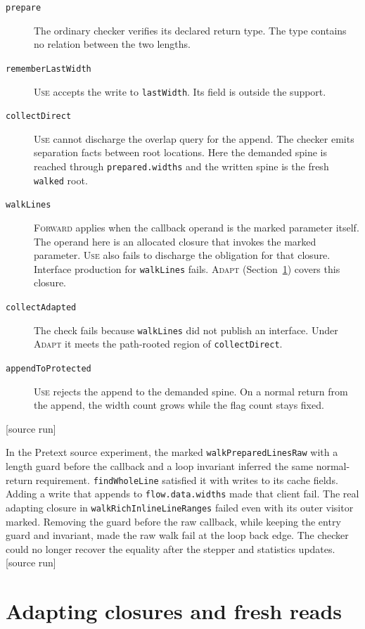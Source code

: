 \documentclass[10pt,a4paper]{article}
\newcommand{\ruleName}[1]{\textcolor{rulec}{\textsc{#1}}}
\theoremstyle{definition}
\newcommand{\code}[1]{\textcolor{codec}{\texttt{#1}}}
\newcommand{\status}[1]{\textcolor{leanc}{\textsf{\small[#1]}}}
\begin{document}
\begin{description}
\item[\code{prepare}] The ordinary checker verifies its declared
return type. The type contains no relation between the two lengths.
\item[\code{rememberLastWidth}] \ruleName{Use} accepts the
write to \code{lastWidth}. Its field is outside the support.
\item[\code{collectDirect}] \ruleName{Use} cannot discharge the
overlap query for the append. The checker emits separation facts
between root locations. Here the demanded spine is reached through
\code{prepared.widths} and the written spine is the fresh
\code{walked} root.
\item[\code{walkLines}] \ruleName{Forward} applies when the
callback operand is the marked parameter itself. The operand here
is an allocated closure that invokes the marked parameter.
\ruleName{Use} also fails to discharge the obligation for that
closure. Interface production for \code{walkLines} fails. \ruleName{Adapt} (Section~\ref{sec:extensions})
covers this closure.
\item[\code{collectAdapted}] The check fails because
\code{walkLines} did not publish an interface. Under \ruleName{Adapt}
it meets the path-rooted region of \code{collectDirect}.
\item[\code{appendToProtected}] \ruleName{Use} rejects the
append to the demanded spine. On a normal return from the append,
the width count grows while the flag count stays fixed.
\end{description}
\status{source run}

In the Pretext source experiment, the marked
\code{walkPreparedLinesRaw} with a length guard before the callback
and a loop invariant inferred the same normal-return requirement.
\code{findWholeLine} satisfied it with writes to its cache fields.
Adding a write that appends to \code{flow.data.widths} made that
client fail. The real adapting closure in
\code{walkRichInlineLineRanges} failed even with its outer visitor
marked. Removing the guard before the raw callback, while keeping
the entry guard and invariant, made the raw walk fail at the loop
back edge. The checker could no longer recover the equality after
the stepper and statistics updates. \status{source run}

\section{Adapting closures and fresh reads}\label{sec:extensions}
\end{document}
